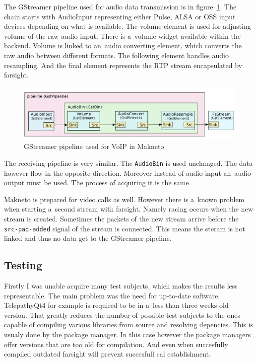 The GStreamer pipeline used for audio data transmission is in figure~\ref{fig:maknetoGstreamerPipeline}. The chain starts with AudioInput representing either Pulse, ALSA or OSS input devices depending on what is available. The volume element is used for adjusting volume of the raw audio input. There is a~volume widget available within the backend. Volume is linked to an~audio converting element, which converts the raw audio between different formats. The following element handles audio resampling. And the final element represents the RTP stream encapsulated by farsight. 

\begin{figure}[ht]
	\begin{center}
	\includegraphics[width=15cm]{fig/makneto-gstreamer-pipeline.pdf}
	\caption{GStreamer pipeline used for VoIP in Makneto}
	\label{fig:maknetoGstreamerPipeline}
\end{center}
\end{figure}

The receiving pipeline is very similar. The \verb|AudioBin| is used unchanged. The data however flow in the opposite direction. Moreover instead of audio input an~audio output must be used. The process of acquiring it is the same.

Makneto is prepared for video calls as well. However there is a~known problem when starting a~second stream with farsight. Namely racing occurs when the new stream is created. Sometimes the packets of the new stream arrive before the \verb|src-pad-added| signal of the stream is connected. This means the steram is not linked and thus no data get to the GStreamer pipeline. 

\subsection*{Testing}
Firstly I was unable acquire many test subjects, which makes the results less representable. The main problem was the need for up-to-date software. TelepathyQt4 for example is required to be in a~less than three weeks old version. That greatly reduces the number of possible test subjects to the ones capable of compiling various libraries from source and resolving depencies. This is usualy done by the package manager. In this case however the package managers offer versions that are too old for compilation. And even when succesfully compiled outdated farsight will prevent succesfull cal establishment.


